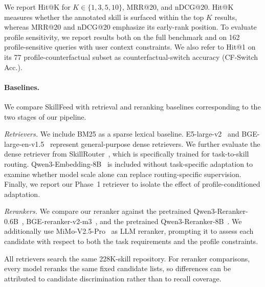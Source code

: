 \documentclass[letterpaper]{article} %
\begin{document}
We report Hit@K for $K\in\{1,3,5,10\}$, MRR@20, and nDCG@20. Hit@K measures whether the annotated skill is surfaced within the top $K$ results, whereas MRR@20 and nDCG@20 emphasize its early-rank position. To evaluate profile sensitivity, we report results both on the full benchmark and on 162 profile-sensitive queries with  user context constraints. We also refer to Hit@1 on its 77 profile-counterfactual subset as counterfactual-switch accuracy (CF-Switch Acc.).



\paragraph{Baselines.}

We compare SkillFeed with retrieval and reranking baselines corresponding to the two stages of our pipeline.

\textit{Retrievers.}
We include BM25 \cite{robertson2009bm25} as a sparse lexical baseline. E5-large-v2~\cite{wang2022e5} and BGE-large-en-v1.5~\cite{bge_embedding} represent general-purpose dense retrievers. We further evaluate the dense retriever from SkillRouter~\cite{zheng2026skillrouter}, which is specifically trained for task-to-skill routing. Qwen3-Embedding-8B~\cite{qwen3embedding} is included without task-specific adaptation to examine whether model scale alone can replace routing-specific supervision. Finally, we report our Phase~1 retriever to isolate the effect of profile-conditioned adaptation.

\textit{Rerankers.}
We compare our reranker against the pretrained Qwen3-Reranker-0.6B~\cite{qwen3embedding}, BGE-reranker-v2-m3~\cite{chen2024bge}, and the pretrained Qwen3-Reranker-8B~\cite{qwen3embedding}. We additionally use MiMo-V2.5-Pro~\cite{mimo2026v25pro} as LLM reranker, prompting it to assess each candidate with respect to both the task requirements and the profile constraints.

All retrievers search the same 228K-skill repository. For reranker comparisons, every model reranks the same fixed candidate lists, so differences can be attributed to candidate discrimination rather than to recall coverage.


\end{document}
